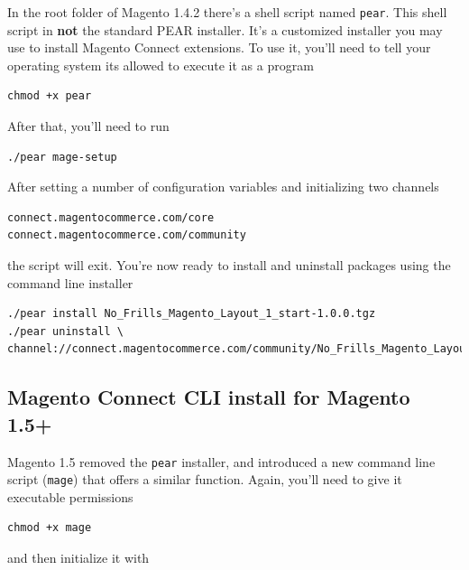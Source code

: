 \documentclass[oneside]{book}
\begin{document}
In the root folder of Magento 1.4.2 there's a shell script named \footnotesize\texttt{pear}\normalsize.  This shell script in \textbf{not} the standard PEAR installer.  It's a customized installer you may use to install Magento Connect extensions.  To use it, you'll need to tell your operating system its allowed to execute it as a program

\begin{lstlisting}
chmod +x pear

\end{lstlisting}


After that, you'll need to run 

\begin{lstlisting}
./pear mage-setup

\end{lstlisting}


After setting a number of configuration variables and initializing two channels

\begin{lstlisting}
connect.magentocommerce.com/core
connect.magentocommerce.com/community

\end{lstlisting}


the script will exit.  You're now ready to install and uninstall packages using the command line installer

\begin{lstlisting}
./pear install No_Frills_Magento_Layout_1_start-1.0.0.tgz
./pear uninstall \
channel://connect.magentocommerce.com/community/No_Frills_Magento_Layout_1_sta...

\end{lstlisting}


\subsection{Magento Connect CLI install for Magento 1.5+}

Magento 1.5 removed the \footnotesize\texttt{pear} \normalsize  installer, and introduced a new command line script (\footnotesize\texttt{mage}\normalsize) that offers a similar function.  Again, you'll need to give it executable permissions 

\begin{lstlisting}
chmod +x mage

\end{lstlisting}


and then initialize it with 
\end{document}
